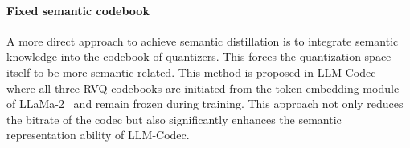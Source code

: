 \paragraph{Fixed semantic codebook} A more direct approach to achieve semantic distillation is to integrate semantic knowledge into the codebook of quantizers. 
This forces the quantization space itself to be more semantic-related.
This method is proposed in LLM-Codec~\cite{yang2024uniaudio15} where all three RVQ codebooks are initiated from the token embedding module of LLaMa-2~\cite{touvron2023llama2} and remain frozen during training.
This approach not only reduces the bitrate of the codec but also significantly enhances the semantic representation ability of LLM-Codec.


